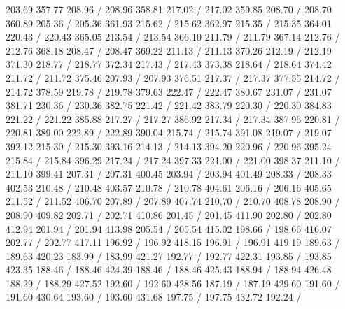 { 203.69 357.77 208.96 /
 208.96 358.81 217.02 /
 217.02 359.85 208.70 /
 208.70 360.89 205.36 /
 205.36 361.93 215.62 /
 215.62 362.97 215.35 /
 215.35 364.01 220.43 /
 220.43 365.05 213.54 /
 213.54 366.10 211.79 /
 211.79 367.14 212.76 /
 212.76 368.18 208.47 /
 208.47 369.22 211.13 /
 211.13 370.26 212.19 /
 212.19 371.30 218.77 /
 218.77 372.34 217.43 /
 217.43 373.38 218.64 /
 218.64 374.42 211.72 /
 211.72 375.46 207.93 /
 207.93 376.51 217.37 /
 217.37 377.55 214.72 /
 214.72 378.59 219.78 /
 219.78 379.63 222.47 /
 222.47 380.67 231.07 /
 231.07 381.71 230.36 /
 230.36 382.75 221.42 /
 221.42 383.79 220.30 /
 220.30 384.83 221.22 /
 221.22 385.88 217.27 /
 217.27 386.92 217.34 /
 217.34 387.96 220.81 /
 220.81 389.00 222.89 /
 222.89 390.04 215.74 /
 215.74 391.08 219.07 /
 219.07 392.12 215.30 /
 215.30 393.16 214.13 /
 214.13 394.20 220.96 /
 220.96 395.24 215.84 /
 215.84 396.29 217.24 /
 217.24 397.33 221.00 /
 221.00 398.37 211.10 /
 211.10 399.41 207.31 /
 207.31 400.45 203.94 /
 203.94 401.49 208.33 /
 208.33 402.53 210.48 /
 210.48 403.57 210.78 /
 210.78 404.61 206.16 /
 206.16 405.65 211.52 /
 211.52 406.70 207.89 /
 207.89 407.74 210.70 /
 210.70 408.78 208.90 /
 208.90 409.82 202.71 /
 202.71 410.86 201.45 /
 201.45 411.90 202.80 /
 202.80 412.94 201.94 /
 201.94 413.98 205.54 /
 205.54 415.02 198.66 /
 198.66 416.07 202.77 /
 202.77 417.11 196.92 /
 196.92 418.15 196.91 /
 196.91 419.19 189.63 /
 189.63 420.23 183.99 /
 183.99 421.27 192.77 /
 192.77 422.31 193.85 /
 193.85 423.35 188.46 /
 188.46 424.39 188.46 /
 188.46 425.43 188.94 /
 188.94 426.48 188.29 /
 188.29 427.52 192.60 /
 192.60 428.56 187.19 /
 187.19 429.60 191.60 /
 191.60 430.64 193.60 /
 193.60 431.68 197.75 /
 197.75 432.72 192.24 /
}
